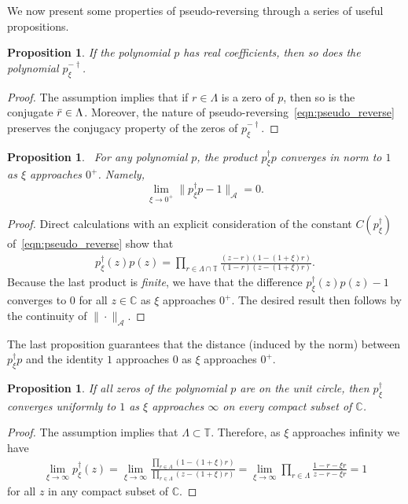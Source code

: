 \documentclass[12pt]{article}
\newtheorem{prop}[theorem]{Proposition}
\begin{document}
We now present some properties of pseudo-reversing through a series of useful propositions.

\begin{prop}
    If the polynomial $p$ has real coefficients, then so does the polynomial $p_\xi^{-\dagger}$.
\end{prop}
\begin{proof}
    The assumption implies that if $r\in\Lambda$ is a zero of $p$, then so is the conjugate $\Bar{r}\in\Lambda$. Moreover, the nature of pseudo-reversing~\eqref{eqn:pseudo_reverse} preserves the conjugacy property of the zeros of $p_\xi^{-\dagger}$.
\end{proof}

\begin{prop}~\label{prop:pseudo_approximation}
    For any polynomial $p$, the product $p_\xi^{\dagger}p$ converges in norm to $1$ as $\xi$ approaches $0^+$. Namely,
    \begin{equation*}
        \lim_{\xi\rightarrow 0^+}\|p_\xi^{\dagger}p - 1\|_{\mathcal{A}}=0.
    \end{equation*}
\end{prop}
\begin{proof}
    Direct calculations with an explicit consideration of the constant $C(p^\dagger_\xi)$ of~\eqref{eqn:pseudo_reverse} show that
    \begin{align*}
        p^\dagger_\xi(z)p(z) = \prod_{r\in\Lambda\cap\mathbb{T}}\frac{(z-r)(1-(1+\xi)r)}{(1-r)(z-(1+\xi)r)}.
    \end{align*}
    Because the last product is \emph{finite}, we have that the difference $p^\dagger_\xi(z)p(z)-1$ converges to $0$ for all $z\in\mathbb{C}$ as $\xi$ approaches $0^+$. The desired result then follows by the continuity of $\|\cdot\|_\mathcal{A}$.
\end{proof}

The last proposition guarantees that the distance (induced by the norm) between $p_\xi^\dagger p$ and the identity $1$ approaches $0$ as $\xi$ approaches $0^+$.

\begin{prop}\label{prop:xi_infinity}
    If all zeros of the polynomial $p$ are on the unit circle, then $p_\xi^{\dagger}$ converges uniformly to $1$ as $\xi$ approaches $\infty$ on every compact subset of $\mathbb{C}$.
\end{prop}
\begin{proof}
    The assumption implies that $\Lambda\subset\mathbb{T}$. Therefore, as $\xi$ approaches infinity we have
    \begin{align*}
        \lim_{\xi\rightarrow\infty} p_\xi^\dagger(z) = \lim_{\xi\rightarrow\infty} \frac{\prod_{r\in\Lambda}(1-(1+\xi)r)}{\prod_{r\in\Lambda}(z-(1+\xi)r)} = \lim_{\xi\rightarrow\infty} \prod_{r\in\Lambda}\frac{1-r-\xi r}{z-r-\xi r} = 1
    \end{align*}
    for all $z$ in any compact subset of $\mathbb{C}$.
\end{proof}
\end{document}
